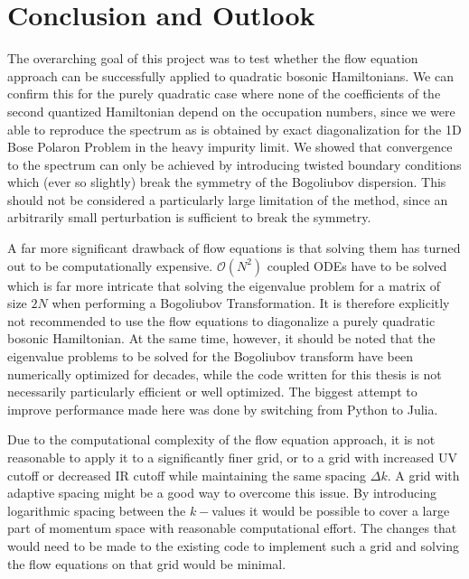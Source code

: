 \chapter{Conclusion and Outlook}\label{Conclusion and Outlook}
The overarching goal of this project was to test whether the flow equation approach can be successfully applied to quadratic bosonic Hamiltonians. We can confirm this for the purely quadratic case where none of the coefficients of the second quantized Hamiltonian depend on the occupation numbers, since we were able to reproduce the spectrum as is obtained by exact diagonalization for the 1D Bose Polaron Problem in the heavy impurity limit. We showed that convergence to the spectrum can only be achieved by introducing twisted boundary conditions which (ever so slightly) break the symmetry of the Bogoliubov dispersion. This should not be considered a particularly large limitation of the method, since an arbitrarily small perturbation is sufficient to break the symmetry. \par
A far more significant drawback of flow equations is that solving them has turned out to be computationally expensive. $\mathcal O(N^2)$ coupled ODEs have to be solved which is far more intricate that solving the eigenvalue problem for a matrix of size $2N$ when performing a Bogoliubov Transformation. It is therefore explicitly not recommended to use the flow equations to diagonalize a purely quadratic bosonic Hamiltonian. At the same time, however, it should be noted that the eigenvalue problems to be solved for the Bogoliubov transform have been numerically optimized for decades, while the code written for this thesis is not necessarily particularly efficient or well optimized. The biggest attempt to improve performance made here was done by switching from Python to Julia.\par
Due to the computational complexity of the flow equation approach, it is not reasonable to apply it to a significantly finer grid, or to a grid with increased UV cutoff or decreased IR cutoff while maintaining the same spacing $\Delta k$. A grid with adaptive spacing might be a good way to overcome this issue. By introducing logarithmic spacing between the $k-$values it would be possible to cover a large part of momentum space with reasonable computational effort. The changes that would need to be made to the existing code to implement such a grid and solving the flow equations on that grid would be minimal.   \par
